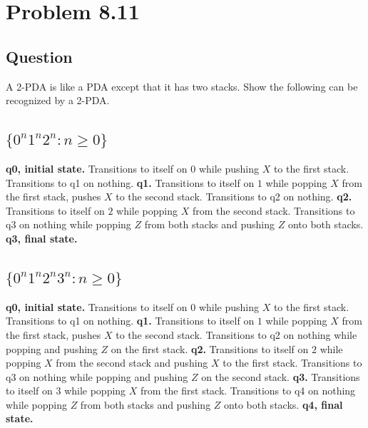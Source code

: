 \documentclass[12pt, a4paper]{article}
\begin{document}
\section{Problem 8.11}
\subsection{Question}
A 2-PDA is like a PDA except that it has two stacks. Show the following can be recognized by a 2-PDA.
\subsection{$\{0^{n}1^{n}2^{n} : n \geq 0 \}$}
\textbf{q0, initial state.} Transitions to itself on $0$ while pushing $X$ to the first stack. Transitions to q1 on nothing.\newline
\textbf{q1.} Transitions to itself on $1$ while popping $X$ from the first stack, pushes $X$ to the second stack. Transitions to q2 on nothing.\newline
\textbf{q2.} Transitions to itself on $2$ while popping $X$ from the second stack. Transitions to q3 on nothing while popping $Z$ from both stacks and pushing $Z$ onto both stacks.\newline
\textbf{q3, final state.}
\subsection{$\{0^{n}1^{n}2^{n}3^{n} : n \geq 0 \}$}
\textbf{q0, initial state.} Transitions to itself on $0$ while pushing $X$ to the first stack. Transitions to q1 on nothing.\newline
\textbf{q1.} Transitions to itself on $1$ while popping $X$ from the first stack, pushes $X$ to the second stack. Transitions to q2 on nothing while popping and pushing $Z$ on the first stack.\newline
\textbf{q2.} Transitions to itself on $2$ while popping $X$ from the second stack and pushing $X$ to the first stack. Transitions to q3 on nothing while popping and pushing $Z$ on the second stack.\newline
\textbf{q3.} Transitions to itself on $3$ while popping $X$ from the first stack. Transitions to q4 on nothing while popping $Z$ from both stacks and pushing $Z$ onto both stacks.\newline
\textbf{q4, final state.}
\end{document}
